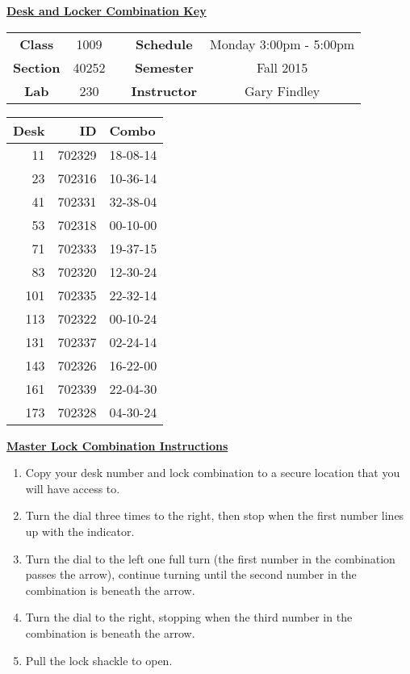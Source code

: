 \documentclass[12pt]{article}
\begin{document}
\thispagestyle{empty}

\begin{center}
	{\huge\textbf{\underline{ Desk and Locker Combination Key}}}
\end{center}


\begin{table}[h]
  \centering
  \begin{tabular}{ccccc}

  \textbf{Class} & 1009 & {\qquad} &\textbf{Schedule} & Monday 3:00pm - 5:00pm \\
  \textbf{Section} & 40252 & {\qquad} & \textbf{Semester} & Fall 2015 \\
  \textbf{Lab} & 230 & {\qquad} & \textbf{Instructor} & Gary Findley \\
  \end{tabular}
\end{table}
 \vspace{0.5in}
\begin{minipage}{0.4\textwidth}

\begin{tabular}{rrl}
\toprule
 Desk &      ID &     Combo \\
\midrule
   11 &  702329 &  18-08-14 \\
   23 &  702316 &  10-36-14 \\
   41 &  702331 &  32-38-04 \\
   53 &  702318 &  00-10-00 \\
   71 &  702333 &  19-37-15 \\
   83 &  702320 &  12-30-24 \\
  101 &  702335 &  22-32-14 \\
  113 &  702322 &  00-10-24 \\
  131 &  702337 &  02-24-14 \\
  143 &  702326 &  16-22-00 \\
  161 &  702339 &  22-04-30 \\
  173 &  702328 &  04-30-24 \\
\bottomrule
\end{tabular}


\end{minipage}
\begin{minipage}{0.4\textwidth}
\underline{{\large \textbf{Master Lock Combination Instructions}}}
\begin{enumerate}
\item Copy your desk number and lock combination to a secure location that you will have access to.
\item Turn the dial three times to the right, then stop when the first number lines up with the indicator.
\item Turn the dial to the left one full turn (the first number in the combination passes the arrow), continue turning until the second number in the combination is beneath the arrow.
\item Turn the dial to the right, stopping when the third number in the combination is beneath the arrow.
\item Pull the lock shackle to open.
\end{enumerate}
\end{minipage}
\end{document}
